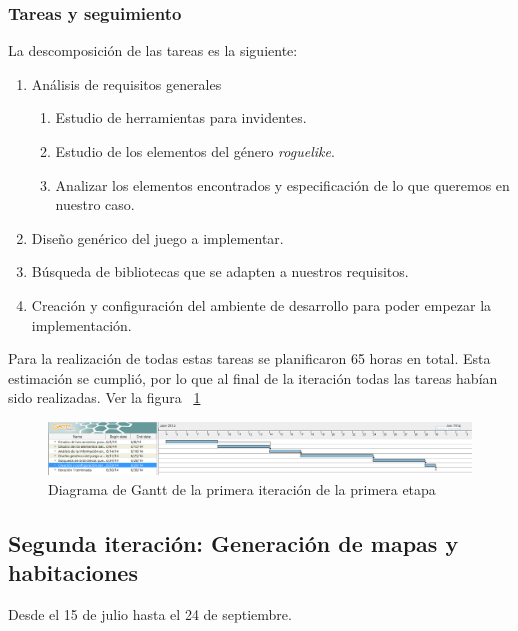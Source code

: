 \subsubsection{Tareas y seguimiento}

La descomposición de las tareas es la siguiente:

\begin{enumerate}[label=\bfseries WBS 1.\arabic*]
  \item Análisis de requisitos generales
    \begin{enumerate}[label=\bfseries WBS 1.1.\arabic*]
      \item Estudio de herramientas para invidentes.
      \item Estudio de los elementos del género \textit{roguelike}.
      \item Analizar los elementos encontrados y especificación de lo que queremos en nuestro caso.
    \end{enumerate}
  \item Diseño genérico del juego a implementar.
  \item Búsqueda de bibliotecas que se adapten a nuestros requisitos.
  \item Creación y configuración del ambiente de desarrollo para poder empezar la implementación.
\end{enumerate}

Para la realización de todas estas tareas se planificaron 65 horas en total. Esta estimación se cumplió, por lo que al final de la iteración todas las tareas habían sido realizadas. Ver la figura ~\ref{fig:sec1it1}

\begin{figure}
    \includegraphics[width=\textwidth,height=\textheight,keepaspectratio]{./img/sec1it1.png}
  \caption{Diagrama de Gantt de la primera iteración de la primera etapa}
  \label{fig:sec1it1}
\end{figure}

\subsection{Segunda iteración: Generación de mapas y habitaciones}

Desde el 15 de julio hasta el 24 de septiembre.

